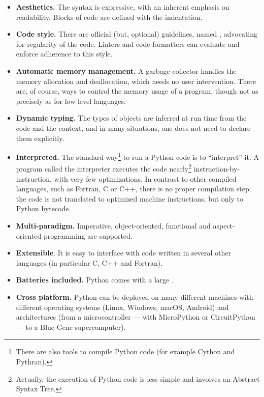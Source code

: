 \begin{itemize}
\item \textbf{Aesthetics.} The syntax is expressive, with an inherent emphasis
on readability. Blocks of code are defined with the indentation.

\item \textbf{Code style.} There are official (but, optional) guidelines, named
, advocating for
regularity of the code. Linters and code-formatters can evaluate and enforce
adherence to this style.

\item \textbf{Automatic memory management.}  A garbage collector handles the
memory allocation and deallocation, which needs no user intervention. There
are, of course, ways to control the memory usage of a program, though not as
precisely as for low-level languages.

\item \textbf{Dynamic typing.}
The types of objects are inferred at run time from the code and the
context, and in many situations, one does not need to declare them explicitly.

\item \textbf{Interpreted.} The standard way\footnote{There are also tools to
compile Python code (for example Cython and Pythran).} to run a Python code is
to ``interpret'' it.  A program called the interpreter executes the code
nearly\footnote{Actually, the execution of Python code is less simple and
involves an Abstract Syntax Tree.} instruction-by-instruction, with very few
optimizations.
%
In contrast to other compiled languages, such as Fortran, C or C++, there is no
proper compilation step: the code is not translated to optimized machine
instructions, but only to Python bytecode.

\item \textbf{Multi-paradigm.} Imperative, object-oriented, functional
and aspect-oriented programming are supported.

\item \textbf{Extensible}. It is easy to interface with code written in
several other languages (in particular C, C++ and Fortran).

\item \textbf{Batteries included.} Python comes with a large
.

\item \textbf{Cross platform.} Python can be deployed on many different
machines with different operating systems (Linux, Windows, macOS, Android) and
architectures (from a microcontroller --- with MicroPython or CircuitPython ---
to a Blue Gene supercomputer).

\end{itemize}
